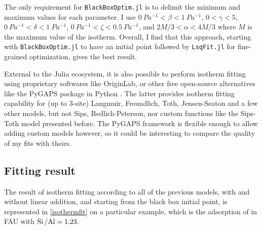 \documentclass[main.tex]{subfiles}
\begin{document}
The only requirement for \texttt{BlackBoxOptim.jl} is to delimit the minimum and maximum values for each parameter. I use $\qty{0}{Pa^{-1}} < \beta < \qty{1}{Pa^{-1}}$, $0 < \gamma < 5$, $\qty{0}{Pa^{-1}} < \delta < \qty{1}{Pa^{-1}}$, $\qty{0}{Pa^{-1}} < \zeta < \qty{0.5}{Pa^{-1}}$, and $2M/3 < \alpha < 4M/3$ where $M$ is the maximum value of the isotherm. Overall, I find that this approach, starting with \texttt{BlackBoxOptim.jl} to have an initial point followed by \texttt{LsqFit.jl} for fine-grained optimization, gives the best result.

External to the Julia ecosystem, it is also possible to perform isotherm fitting using proprietary softwares like OriginLab, or other free open-source alternatives like the PyGAPS package in Python \autocite{pyGAPS}. The latter provides isotherm fitting capability for (up to 3-site) Langmuir, Freundlich, Toth, Jensen-Seaton and a few other models, but not Sips, Redlich-Peterson, nor custom functions like the Sips-Toth model presented before. The PyGAPS framework is flexible enough to allow adding custom models however, so it could be interesting to compare the quality of my fits with theirs.

\subsection{Fitting result}

The result of isotherm fitting according to all of the previous models, with and without linear addition, and starting from the black box initial point, is represented in \cref{isothermfit} on a particular example, which is the adsorption of  in FAU with $\mbox{Si\,/Al} = \num{1.23}$.
\end{document}
